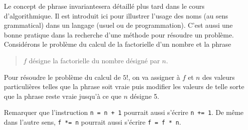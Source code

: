 Le concept de \og phrase invariante\fg sera détaillé plus tard dans le cours d'algorithmique. Il est introduit ici pour illustrer l'usage des noms (au sens grammatical) dans un langage (usuel ou de programmation). C'est aussi une bonne pratique dans la recherche d'une méthode pour résoudre un problème.\newline
Considérons le problème du calcul de la factorielle d'un nombre et la phrase
\begin{quote}
  \og $f$ désigne la factorielle du nombre désigné par $n$.\fg
\end{quote}
Pour résoudre le problème du calcul de $5!$, on va assigner à $f$ et $n$ des valeurs particulières telles que la phrase soit vraie puis modifier les valeurs de telle sorte que la phrase reste vraie jusqu'à ce que $n$ désigne 5.

Remarquer que l'instruction \texttt{n = n + 1} pourrait aussi s'écrire \texttt{n += 1}. De même dans l'autre sens, \texttt{f *= n} pourrait aussi s'écrire \texttt{f = f * n}.